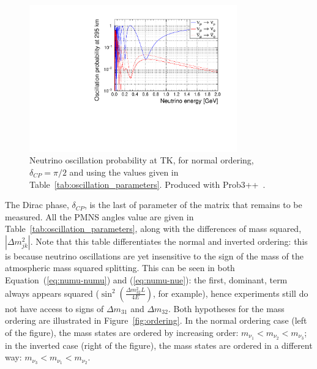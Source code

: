 \begin{figure}[ht]
  \center
  \includegraphics[width=0.8\textwidth]{images/Intro/Oscillation.pdf}
  \caption[Neutrino oscillation probability at T2K]{Neutrino
    oscillation probability at \Gls{TK}, for normal ordering,
    $\delta_{CP}=\pi/2$ and using the values given in
    Table~\ref{tab:oscillation_parameters}. Produced with
    Prob3++~\cite{prob3pp}.}
  \label{fig:oscillationprob}
\end{figure}


The Dirac phase, $\delta_{CP}$, is the last of parameter of the matrix
that remains to be measured. All the \Gls{PMNS} angles value are given
in Table~\ref{tab:oscillation_parameters}, along with the differences
of mass squared, $|\Delta m^2_{jk}|$. Note that this table
differentiates the normal and inverted ordering: this is because
neutrino oscillations are yet insensitive to the sign of the mass of
the atmospheric mass squared splitting. This can be seen in both
Equation~(\ref{eq:numu-numu}) and (\ref{eq:numu-nue}): the first,
dominant, term always appears squared
($\sin^2\left(\frac{\Delta m^2_{32}L}{4E}\right)$, for example), hence
experiments still do not have access to signs of $\Delta m_{31}$ and
$\Delta m_{32}$. Both hypotheses for the mass ordering are illustrated
in Figure~\ref{fig:ordering}. In the normal ordering case (left of the
figure), the mass states are ordered by increasing order:
$m_{\nu_1}<m_{\nu_2}<m_{\nu_3}$; in the inverted case (right of the
figure), the mass states are ordered in a different way:
$m_{\nu_3}<m_{\nu_1}<m_{\nu_2}$.


